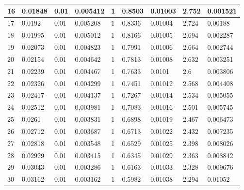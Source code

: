 \begin{table}[h!]
\begin{tabular}{|l|l|l|l|l|l|l|l|l|}
		16 & 0.01848  & 0.01     & 0.005412 & 1               & 0.8503 & 0.01003 & 2.752 & 0.001521  \\ \hline
		17 & 0.0192   & 0.01     & 0.005208 & 1               & 0.8336 & 0.01004 & 2.724 & 0.00188   \\ \hline
		18 & 0.01995  & 0.01     & 0.005012 & 1               & 0.8166 & 0.01005 & 2.694 & 0.002287  \\ \hline
		19 & 0.02073  & 0.01     & 0.004823 & 1               & 0.7991 & 0.01006 & 2.664 & 0.002744  \\ \hline
		20 & 0.02154  & 0.01     & 0.004642 & 1               & 0.7813 & 0.01008 & 2.632 & 0.003251  \\ \hline
		21 & 0.02239  & 0.01     & 0.004467 & 1               & 0.7633 & 0.0101  & 2.6   & 0.003806  \\ \hline
		22 & 0.02326  & 0.01     & 0.004299 & 1               & 0.7451 & 0.01012 & 2.568 & 0.004408  \\ \hline
		23 & 0.02417  & 0.01     & 0.004137 & 1               & 0.7267 & 0.01014 & 2.534 & 0.005055  \\ \hline
		24 & 0.02512  & 0.01     & 0.003981 & 1               & 0.7083 & 0.01016 & 2.501 & 0.005745  \\ \hline
		25 & 0.0261   & 0.01     & 0.003831 & 1               & 0.6898 & 0.01019 & 2.467 & 0.006473  \\ \hline
		26 & 0.02712  & 0.01     & 0.003687 & 1               & 0.6713 & 0.01022 & 2.432 & 0.007235  \\ \hline
		27 & 0.02818  & 0.01     & 0.003548 & 1               & 0.6529 & 0.01025 & 2.398 & 0.008026  \\ \hline
		28 & 0.02929  & 0.01     & 0.003415 & 1               & 0.6345 & 0.01029 & 2.363 & 0.008842  \\ \hline
		29 & 0.03043  & 0.01     & 0.003286 & 1               & 0.6163 & 0.01033 & 2.328 & 0.009676  \\ \hline
		30 & 0.03162  & 0.01     & 0.003162 & 1               & 0.5982 & 0.01038 & 2.294 & 0.01052   \\ \hline
	\end{tabular}
	\label{table:results}
\end{table}